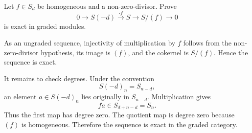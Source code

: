 \begin{problem}\label{prob:vi34-06}
Let \(f\in S_d\) be homogeneous and a non-zero-divisor. Prove
\[
0\to S(-d)\xrightarrow{\cdot f}S\to S/(f)\to0
\]
is exact in graded modules.
\end{problem}

\ifdefined\FullProblemDossiers
\begin{solution}
As an ungraded sequence, injectivity of multiplication by \(f\) follows from the non-zero-divisor hypothesis,
its image is \((f)\), and the cokernel is \(S/(f)\). Hence the sequence is exact.

It remains to check degrees. Under the convention
\[
S(-d)_n=S_{n-d},
\]
an element \(a\in S(-d)_n\) lies originally in \(S_{n-d}\). Multiplication gives
\[
fa\in S_{d+n-d}=S_n.
\]
Thus the first map has degree zero. The quotient map is degree zero because \((f)\) is homogeneous. Therefore the
sequence is exact in the graded category.
\end{solution}
\fi
